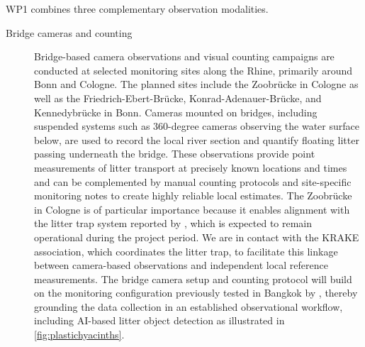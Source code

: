 \documentclass{scrartcl}
\begin{document}
WP1 combines three complementary observation modalities.
\begin{description}
    \item[Bridge cameras and counting] Bridge-based camera observations and visual counting campaigns are conducted at selected monitoring sites along the Rhine, primarily around Bonn and Cologne. The planned sites include the Zoobrücke in Cologne as well as the Friedrich-Ebert-Brücke, Konrad-Adenauer-Brücke, and Kennedybrücke in Bonn. Cameras mounted on bridges, including suspended systems such as 360-degree cameras observing the water surface below, are used to record the local river section and quantify floating litter passing underneath the bridge. These observations provide point measurements of litter transport at precisely known locations and times and can be complemented by manual counting protocols and site-specific monitoring notes to create highly reliable local estimates. The Zoobrücke in Cologne is of particular importance because it enables alignment with the litter trap system reported by \cite{gnann2026river}, which is expected to remain operational during the project period. We are in contact with the KRAKE association, which coordinates the litter trap, to facilitate this linkage between camera-based observations and independent local reference measurements. The bridge camera setup and counting protocol will build on the monitoring configuration previously tested in Bangkok by , thereby grounding the data collection in an established observational workflow, including AI-based litter object detection as illustrated in \cref{fig:plastichyacinths}.


\end{description}
\end{document}
